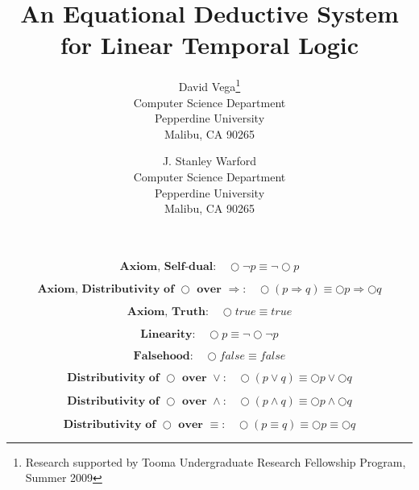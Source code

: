 \documentclass[fleqn, leqno]{article}
\title{An Equational Deductive System\\for Linear Temporal Logic}
\author{David Vega\thanks{Research supported by Tooma Undergraduate Research Fellowship Program, Summer 2009}\\
   Computer Science Department\\
   Pepperdine University\\
   Malibu, CA 90265
   \and
   J. Stanley Warford\\
   Computer Science Department\\
   Pepperdine University\\
   Malibu, CA 90265}
\date{} %
\newcommand{\next}{\bigcirc}
\newcommand{\spacer}{\vspace{-30pt}}
\begin{document}
\maketitle

\begin{equation}\label{E:selfDual}
\textbf{Axiom, Self-dual:}\quad \next\lnot p \equiv \lnot\next p
\end{equation}

\spacer

\begin{equation}\label{E:distNextImp}
\textbf{Axiom, Distributivity of $\next$ over $\Rightarrow$:}\quad \next (p \Rightarrow q) \equiv \next p \Rightarrow \next q
\end{equation}

\spacer

\begin{equation}\label{E:nextTruth}
\textbf{Axiom, Truth:}\quad \next true \equiv true
\end{equation}

\spacer

\begin{equation}\label{E:linearity}
\textbf{Linearity:}\quad \next p \equiv \lnot\next\lnot p
\end{equation}

\spacer

\begin{equation}\label{E:nextFalse}
\textbf{Falsehood:}\quad \next false \equiv false
\end{equation}

\spacer

\begin{equation}\label{E:distNextOr}
\textbf{Distributivity of $\next$ over $\lor$:}\quad \next (p \lor q) \equiv \next p \lor \next q
\end{equation}

\spacer

\begin{equation}\label{E:distNextAnd}
\textbf{Distributivity of $\next$ over $\land$:}\quad \next (p \land q) \equiv \next p \land \next q
\end{equation}

\spacer

\begin{equation}\label{E:distNextEquiv}
\textbf{Distributivity of $\next$ over $\equiv$:}\quad \next (p \equiv q) \equiv \next p \equiv \next q
\end{equation}

\spacer
\end{document}
